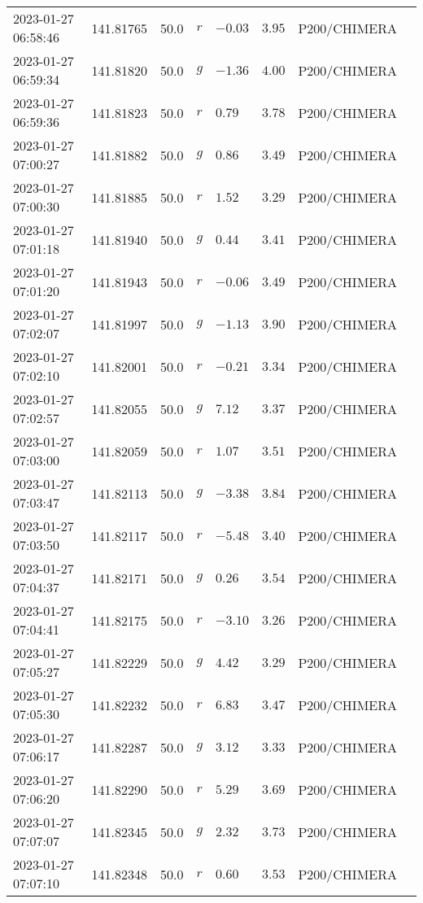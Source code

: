 \documentclass{nature_plusfigure}
\begin{document}
\begin{supplement}
\begin{center}
\begin{longtable}{llllllll}
2023-01-27 06:58:46 & 141.81765 & 50.0 & $r$ & $-0.03$ & $3.95$ & P200/CHIMERA &  \\ 
2023-01-27 06:59:34 & 141.81820 & 50.0 & $g$ & $-1.36$ & $4.00$ & P200/CHIMERA &  \\ 
2023-01-27 06:59:36 & 141.81823 & 50.0 & $r$ & $0.79$ & $3.78$ & P200/CHIMERA &  \\ 
2023-01-27 07:00:27 & 141.81882 & 50.0 & $g$ & $0.86$ & $3.49$ & P200/CHIMERA &  \\ 
2023-01-27 07:00:30 & 141.81885 & 50.0 & $r$ & $1.52$ & $3.29$ & P200/CHIMERA &  \\ 
2023-01-27 07:01:18 & 141.81940 & 50.0 & $g$ & $0.44$ & $3.41$ & P200/CHIMERA &  \\ 
2023-01-27 07:01:20 & 141.81943 & 50.0 & $r$ & $-0.06$ & $3.49$ & P200/CHIMERA &  \\ 
2023-01-27 07:02:07 & 141.81997 & 50.0 & $g$ & $-1.13$ & $3.90$ & P200/CHIMERA &  \\ 
2023-01-27 07:02:10 & 141.82001 & 50.0 & $r$ & $-0.21$ & $3.34$ & P200/CHIMERA &  \\ 
2023-01-27 07:02:57 & 141.82055 & 50.0 & $g$ & $7.12$ & $3.37$ & P200/CHIMERA &  \\ 
2023-01-27 07:03:00 & 141.82059 & 50.0 & $r$ & $1.07$ & $3.51$ & P200/CHIMERA &  \\ 
2023-01-27 07:03:47 & 141.82113 & 50.0 & $g$ & $-3.38$ & $3.84$ & P200/CHIMERA &  \\ 
2023-01-27 07:03:50 & 141.82117 & 50.0 & $r$ & $-5.48$ & $3.40$ & P200/CHIMERA &  \\ 
2023-01-27 07:04:37 & 141.82171 & 50.0 & $g$ & $0.26$ & $3.54$ & P200/CHIMERA &  \\ 
2023-01-27 07:04:41 & 141.82175 & 50.0 & $r$ & $-3.10$ & $3.26$ & P200/CHIMERA &  \\ 
2023-01-27 07:05:27 & 141.82229 & 50.0 & $g$ & $4.42$ & $3.29$ & P200/CHIMERA &  \\ 
2023-01-27 07:05:30 & 141.82232 & 50.0 & $r$ & $6.83$ & $3.47$ & P200/CHIMERA &  \\ 
2023-01-27 07:06:17 & 141.82287 & 50.0 & $g$ & $3.12$ & $3.33$ & P200/CHIMERA &  \\ 
2023-01-27 07:06:20 & 141.82290 & 50.0 & $r$ & $5.29$ & $3.69$ & P200/CHIMERA &  \\ 
2023-01-27 07:07:07 & 141.82345 & 50.0 & $g$ & $2.32$ & $3.73$ & P200/CHIMERA &  \\ 
2023-01-27 07:07:10 & 141.82348 & 50.0 & $r$ & $0.60$ & $3.53$ & P200/CHIMERA &  \\ 

\end{longtable}
\end{center}
\end{supplement}
\end{document}
